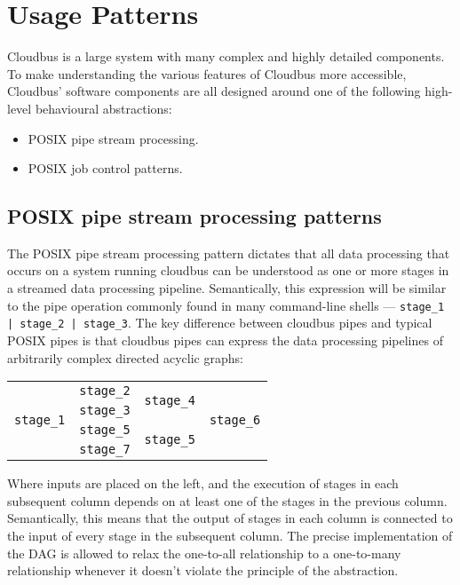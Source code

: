 \section{Usage Patterns}
Cloudbus is a large system with many complex and highly detailed components. To make understanding the various features of Cloudbus %
more accessible, Cloudbus' software components are all designed around one of the following high-level behavioural abstractions:
\begin{itemize}
	\item POSIX pipe stream processing.
	\item POSIX job control patterns.
\end{itemize}
\subsection{POSIX pipe stream processing patterns}
The POSIX pipe stream processing pattern dictates that all data processing that occurs on a system running cloudbus can be understood as one %
or more stages in a streamed data processing pipeline. Semantically, this expression will be similar to the pipe operation commonly found %
in many command-line shells --- \texttt{stage\_1 | stage\_2 | stage\_3}. The key difference between cloudbus pipes and typical POSIX pipes %
is that cloudbus pipes can express the data processing pipelines of arbitrarily complex directed acyclic graphs:
\begin{center}
	\begin{tabular}{c|c|c|c}
		\multirow{4}{*}{\texttt{stage\_1}} & \texttt{stage\_2} & \multirow{2}{*}{\texttt{stage\_4}} & \multirow{4}{*}{\texttt{stage\_6}} \\
																			 & \texttt{stage\_3} & 																		& \\
																			 & \texttt{stage\_5} & \multirow{2}{*}{\texttt{stage\_5}}	& \\
																			 & \texttt{stage\_7} & 																		&
	\end{tabular}
\end{center}
Where inputs are placed on the left, and the execution of stages in each subsequent column depends on at least one of the stages in the %
previous column. Semantically, this means that the output of stages in each column is connected to the input of every stage in the %
subsequent column. The precise implementation of the DAG is allowed to relax the one-to-all relationship to a one-to-many relationship %
whenever it doesn't violate the principle of the abstraction.

